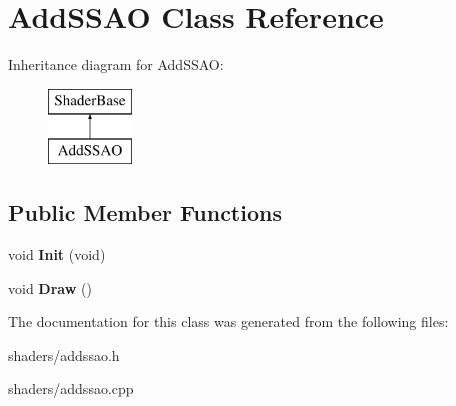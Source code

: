 \hypertarget{classAddSSAO}{\section{\-Add\-S\-S\-A\-O \-Class \-Reference}
\label{classAddSSAO}
}
\-Inheritance diagram for \-Add\-S\-S\-A\-O\-:\begin{figure}[H]
\begin{center}
\leavevmode
\includegraphics[height=2.000000cm]{classAddSSAO}
\end{center}
\end{figure}
\subsection*{\-Public \-Member \-Functions}
\begin{DoxyCompactItemize}
\item 
\hypertarget{classAddSSAO_a43ef5bf5dc19032e28fc0f45243a39f2}{void {\bfseries \-Init} (void)}\label{classAddSSAO_a43ef5bf5dc19032e28fc0f45243a39f2}

\item 
\hypertarget{classAddSSAO_a99b63b310cdde0d19459b660dcd4c8f9}{void {\bfseries \-Draw} ()}\label{classAddSSAO_a99b63b310cdde0d19459b660dcd4c8f9}

\end{DoxyCompactItemize}


\-The documentation for this class was generated from the following files\-:\begin{DoxyCompactItemize}
\item 
shaders/addssao.\-h\item 
shaders/addssao.\-cpp\end{DoxyCompactItemize}
